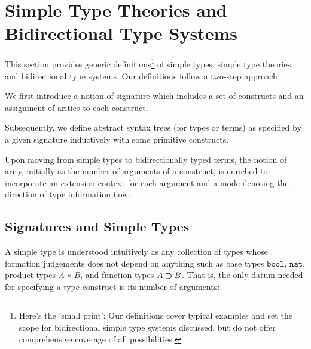 
\section{Simple Type Theories and Bidirectional Type Systems}\label{sec:defs}
This section provides generic definitions\footnote{%
Here's the 'small print': Our definitions cover typical examples and set the scope for bidirectional simple type systems discussed, but do not offer comprehensive coverage of all possibilities.}
of simple types, simple type theories, and bidirectional type systems.
Our definitions follow a two-step approach:
\begin{enumerate*}
\item We first introduce a notion of signature which includes a set of constructs and an assignment of arities to each construct.
\item Subsequently, we define abstract syntax trees (for types or terms) as specified by a given signature inductively with some primitive constructs.
\end{enumerate*}
Upon moving from simple types to bidirectionally typed terms, the notion of arity, initially as the number of arguments of a construct, is enriched to incorporate an extension context for each argument and a mode denoting the direction of type information flow.

\subsection{Signatures and Simple Types} \label{subsec:simple-types}
A simple type is understood intuitively as any collection of types whose formation judgements does not depend on anything such as base types $\mathtt{bool}$, $\mathtt{nat}$, product types $A \times B$, and function types $A \mathbin{\bm{\supset}} B$.
That is, the only datum needed for specifying a type construct is its number of arguments: 

